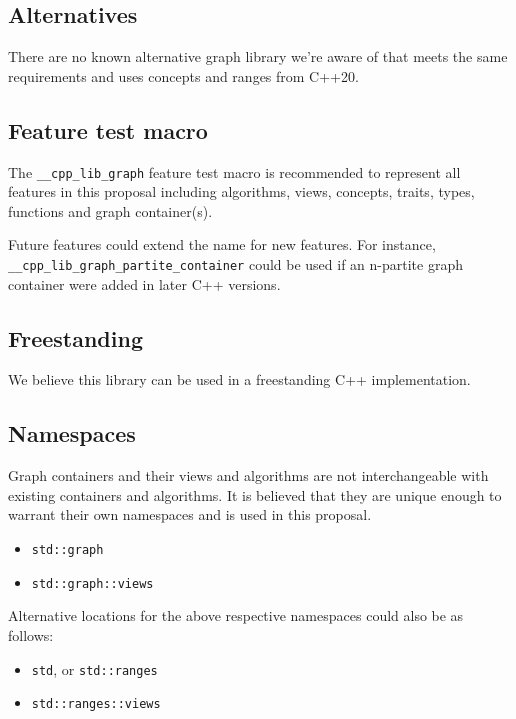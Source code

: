 \documentclass[10pt,onecolumn]{article}
\newcommand{\tcode}[1]{\lstinline[breaklines=true]{#1}}
\begin{document}
\subsection{Alternatives}
There are no known alternative graph library we're aware of that meets the same requirements and uses concepts and ranges from C++20.


\subsection{Feature test macro}
The \tcode{__cpp_lib_graph} feature test macro is recommended to represent all features in this proposal including algorithms, views, concepts, traits, types, functions and graph container(s).

Future features could extend the name for new features. For instance, \tcode{__cpp_lib_graph_partite_container} could be used if an n-partite graph container were added in later C++ versions.

\subsection{Freestanding}
We believe this library can be used in a freestanding C++ implementation.

\subsection{Namespaces}
Graph containers and their views and algorithms are not interchangeable with existing containers and algorithms.
It is believed that they are unique enough to warrant their own namespaces and is used in this proposal.
\begin{itemize}
\item[]\tcode{std::graph}
\item[]\tcode{std::graph::views}
\end{itemize}

\noindent
Alternative locations for the above respective namespaces could also be as follows:
\begin{itemize}
\item[]\tcode{std}, or \tcode{std::ranges}
\item[]\tcode{std::ranges::views}
\end{itemize}
\end{document}
